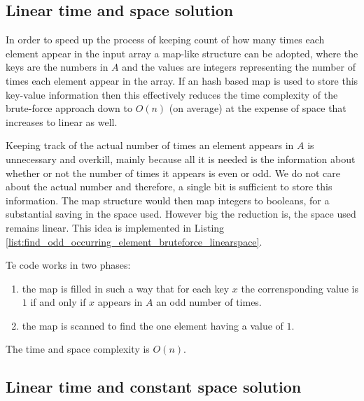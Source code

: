 \subsection{Linear time and space solution}
\label{find_odd_occurring_element:sec:map}

In order to speed up the process of keeping count of how many times each element appear in the input array a map-like structure can be adopted, where the keys are the numbers in $A$ and the values are integers representing the number of times each element appear in the array.
If an hash based map is used to store this key-value information then this effectively reduces the time complexity of the brute-force approach down to $O(n)$ (on average) at the expense of space that increases to linear as well.

Keeping track of the actual number of times an element appears in $A$ is unnecessary and overkill, mainly because all it is needed is the information about whether or not the number of times it appears is even or odd. We do not care about the actual number and therefore, a single bit is sufficient to store this information. The map structure would then map integers to booleans, for a substantial saving in the space used. However big the reduction is, the space used remains linear. 
This idea is implemented in Listing \ref{list:find_odd_occurring_element_bruteforce_linearspace}.




Te code works in two phases:
\begin{enumerate}
	\item the map  is filled in such a way that for each key $x$ the corrensponding value is $1$ if and only if $x$ appears in $A$ an odd number of times.
	\item the map is scanned to find the one element having a value of $1$.
\end{enumerate}
The time and space complexity is $O(n)$.

\subsection{Linear time and constant space solution}
\label{find_odd_occurring_element:sec:constant_space}

